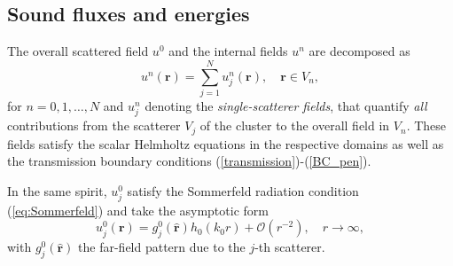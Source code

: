 \documentclass{article}
\begin{document}
\subsection{Sound fluxes and energies}
%
The overall scattered field $u^{0}$ and the internal fields $u^{n}$ are decomposed as
%
\begin{equation}\label{sum_decomp}
    u^{n}(\mathbf{r})=\sum_{j=1}^{N}u_j^n(\mathbf{r}), \quad \mathbf{r}\in V_n,
\end{equation}
%
for $n=0,1,\ldots,N$ and $u_j^n$ denoting the \emph{single-scatterer fields}, that quantify \emph{all} contributions from the scatterer $V_j$ of the cluster to the overall field in $V_n$. These fields satisfy the scalar Helmholtz equations in the respective domains as well as the transmission boundary conditions (\ref{transmission})-(\ref{BC_pen}).

In the same spirit, $u_j^\mathrm{0}$ satisfy the Sommerfeld radiation condition (\ref{eq:Sommerfeld}) and take the asymptotic form \cite{Colton-Kress-IEM}
%
\begin{equation}\label{far-field}
    u_j^0(\mathbf{r})=g_j^0(\hat{\mathbf{r}})h_0(k_0r)+\mathcal{O}(r^{-2}), \quad r\rightarrow\infty,
\end{equation}
%
with $g_j^0(\hat{\mathbf{r}})$ the far-field pattern due to the $j$-th scatterer. 
\end{document}
